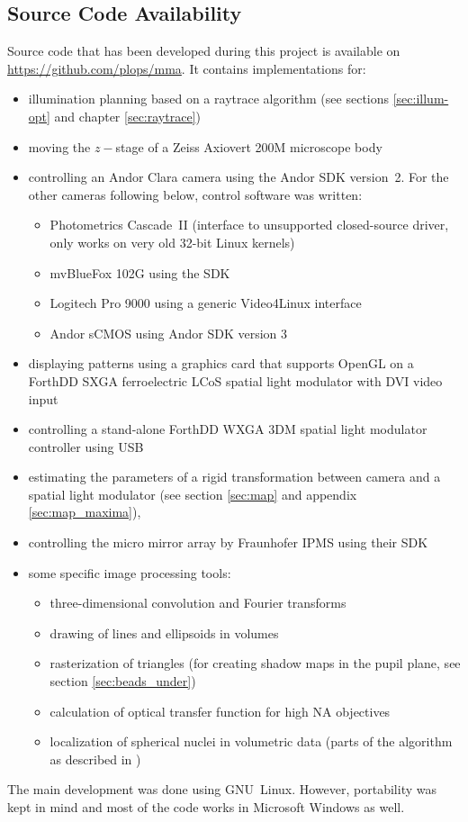 \documentclass[oneside,a4paper,12pt,BCOR20mm,DIV14]{scrbook} %
\begin{document}
\subsection*{Source Code Availability}
Source code that has been developed during this project is available
on \url{https://github.com/plops/mma}.  It contains implementations
for:
\begin{itemize}
\item illumination planning based on a raytrace algorithm (see
  sections \ref{sec:illum-opt} and chapter \ref{sec:raytrace})
\item moving the $z-$stage of a Zeiss Axiovert 200M microscope body
\item controlling an Andor Clara camera using the Andor SDK
  version~2. For the other cameras following below, control software
  was written:
  \begin{itemize}
  \item Photometrics Cascade~II (interface to unsupported
    closed-source driver, only works on very old 32-bit Linux kernels)
  \item mvBlueFox 102G using the SDK
  \item Logitech Pro 9000 using a generic Video4Linux interface
  \item Andor sCMOS using Andor SDK version 3
  \end{itemize}
\item displaying patterns using a graphics card that supports OpenGL
  on a ForthDD SXGA ferroelectric LCoS spatial light modulator with DVI video input
\item controlling a stand-alone ForthDD WXGA 3DM spatial light
  modulator controller using USB
\item estimating the parameters of a rigid transformation between
  camera and a spatial light modulator (see section \ref{sec:map} and appendix
  \ref{sec:map_maxima}),
\item controlling the micro mirror array by Fraunhofer IPMS using
  their SDK
\item some specific image processing tools:
  \begin{itemize}
  \item three-dimensional convolution and Fourier transforms
  \item drawing of lines and ellipsoids in volumes
  \item rasterization of triangles (for creating shadow maps in the
    pupil plane, see section \ref{sec:beads_under})
  \item calculation of optical transfer function for high NA
    objectives
  \item localization of spherical nuclei in volumetric data (parts of
    the algorithm as described in \citet{Santella2010})
  \end{itemize}
\end{itemize}
The main development was done using GNU~Linux. However, portability
was kept in mind and most of the code works in Microsoft Windows as
well.
\end{document}

